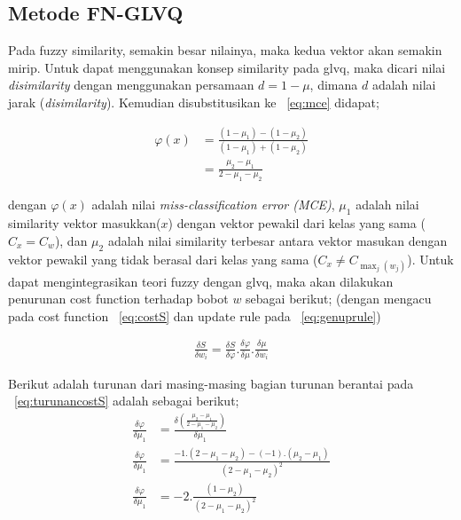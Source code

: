 \subsection{Metode FN-GLVQ}
Pada fuzzy similarity, semakin besar nilainya, maka kedua vektor akan semakin
mirip. Untuk dapat menggunakan konsep similarity pada \gls{glvq}, maka dicari
nilai \emph{disimilarity}  dengan menggunakan persamaan $d = 1 - \mu$, dimana
$d$ adalah nilai jarak (\emph{disimilarity}). Kemudian disubstitusikan ke
\equ~\ref{eq:mce} didapat;

\begin{align}
\label{eq:}
	\varphi(x) &= \frac{(1 - \mu_1) - (1 - \mu_2)}{(1 - \mu_1) + (1 -
	\mu_2)}\nonumber\\
	&= \frac{\mu_2 - \mu_1}{2 - \mu_1 - \mu_2}
\end{align}

dengan $\varphi(x)$ adalah nilai \emph{miss-classification error (MCE)},
$\mu_1$ adalah nilai similarity vektor masukkan($x$) dengan vektor pewakil dari
kelas yang sama ($C_x = C_w$), dan $\mu_2$ adalah nilai similarity
terbesar antara vektor masukan dengan vektor pewakil yang tidak berasal dari
kelas yang sama ($C_x \neq C_{\max_{j}(w_j)}$).  Untuk dapat mengintegrasikan
teori fuzzy dengan \gls{glvq}, maka akan dilakukan penurunan  cost function
terhadap bobot $w$ sebagai berikut; (dengan mengacu pada cost function
\equ~\ref{eq:costS} dan update rule pada \equ~\ref{eq:genuprule})

\begin{align}
\label{eq:turunancostS}
	\frac{\delta S}{\delta w_i} =  
	\frac{\delta S}{\delta \varphi} . \frac{\delta \varphi}{\delta \mu}.
	\frac{\delta \mu}{\delta w_i}
\end{align}


\noindent Berikut adalah turunan dari masing-masing bagian turunan berantai pada
\equ~\ref{eq:turunancostS} adalah sebagai berikut; 
\begin{align}
\label{eq:turunanmce1}
	\frac{\delta \varphi}{\delta \mu_1} &= 
	\frac{\delta \left(\frac{\mu_2-\mu_1}{2-\mu_1-\mu_2}\right)}{\delta \mu_1} 
	\nonumber \\ \frac{\delta \varphi}{\delta \mu_1} &=  
	\frac{-1 . (2 - \mu_1 - \mu_2) - (-1).(\mu_2-\mu_1)}
	{(2 - \mu_1 - \mu_2)^2} \nonumber \\
	\frac{\delta \varphi}{\delta \mu_1} &=  
	-2.\frac{(1 - \mu_2)}{(2 - \mu_1 - \mu_2)^2}
\end{align}

